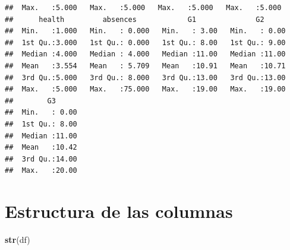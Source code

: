 \documentclass[
]{article}
\newenvironment{Shaded}{\begin{snugshade}}{\end{snugshade}}
\newcommand{\KeywordTok}[1]{\textcolor[rgb]{0.13,0.29,0.53}{\textbf{#1}}}
\newcommand{\NormalTok}[1]{#1}
\begin{document}
\begin{verbatim}
##  Max.   :5.000   Max.   :5.000   Max.   :5.000   Max.   :5.000  
##      health         absences            G1              G2       
##  Min.   :1.000   Min.   : 0.000   Min.   : 3.00   Min.   : 0.00  
##  1st Qu.:3.000   1st Qu.: 0.000   1st Qu.: 8.00   1st Qu.: 9.00  
##  Median :4.000   Median : 4.000   Median :11.00   Median :11.00  
##  Mean   :3.554   Mean   : 5.709   Mean   :10.91   Mean   :10.71  
##  3rd Qu.:5.000   3rd Qu.: 8.000   3rd Qu.:13.00   3rd Qu.:13.00  
##  Max.   :5.000   Max.   :75.000   Max.   :19.00   Max.   :19.00  
##        G3       
##  Min.   : 0.00  
##  1st Qu.: 8.00  
##  Median :11.00  
##  Mean   :10.42  
##  3rd Qu.:14.00  
##  Max.   :20.00
\end{verbatim}

\hypertarget{estructura-de-las-columnas}{%
\section{Estructura de las columnas}\label{estructura-de-las-columnas}}

\begin{Shaded}
\begin{Highlighting}[]
\KeywordTok{str}\NormalTok{(df)}
\end{Highlighting}
\end{Shaded}
\end{document}
